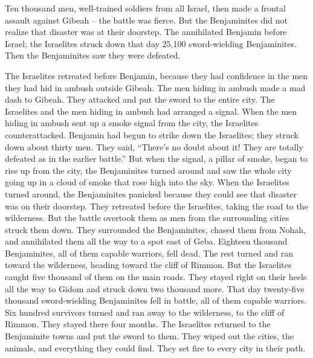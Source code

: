 {Ten
thousand
men,
well-trained
soldiers from all
Israel,
then
made a frontal
assault
against Gibeah
– the battle
was fierce.
But the Benjaminites did not
realize
that
disaster
was at their doorstep.
The
{}
annihilated
Benjamin
before
Israel;
the Israelites
struck down
that day
25,100
sword-wielding
Benjaminites.
Then the Benjaminites
saw
they were defeated.
\par }{\PP The Israelites
retreated before Benjamin,
because
they had confidence
in the men they had
hid
in ambush
outside Gibeah.
The men hiding in ambush
made a mad
dash
to
Gibeah.
They
attacked
and put the sword
to the entire
city.
The Israelites
and the men
hiding in ambush
had arranged
a signal.
When the men hiding in ambush sent up
a smoke
signal
from
the city,
the Israelites
counterattacked.
Benjamin
had begun
to strike
down the Israelites;
they struck
down about thirty
men.
They said,
“There’s no doubt
about it! They are totally defeated
as in the earlier
battle.”
But when the signal,
a pillar
of smoke,
began
to rise up
from
the city,
the Benjaminites
turned
around
and saw
the whole
city
going up
in a cloud of smoke that rose high into the sky.
When the Israelites
turned around,
the Benjaminites
panicked
because
they could see
that
disaster
was on
their doorstep.
They retreated
before
the Israelites,
taking the road
to the wilderness.
But the battle
overtook
them as
men
from
the surrounding cities
struck
them down.
They surrounded
the Benjaminites,
chased
them from Nohah,
and annihilated
them all the way to
a spot east
of Geba.
Eighteen
thousand
Benjaminites,
all
of them capable warriors,
fell dead.
The rest turned
and ran
toward the wilderness,
heading toward
the cliff
of Rimmon.
But the Israelites caught
five
thousand
of them
on the main roads.
They stayed right on their heels
all the way
to Gidom
and struck down
two thousand more.
That day
twenty-five
thousand
sword-wielding
Benjaminites
fell
in battle,
all
of them capable
warriors.
Six
hundred
survivors
turned
and ran away
to the wilderness,
to
the cliff
of Rimmon.
They stayed
there four
months.
The Israelites
returned
to
the Benjaminite
towns
and put
the sword
to them. They wiped out
the cities, the animals,
and everything
they could find.
They set
fire
to every
city in their path.

}
